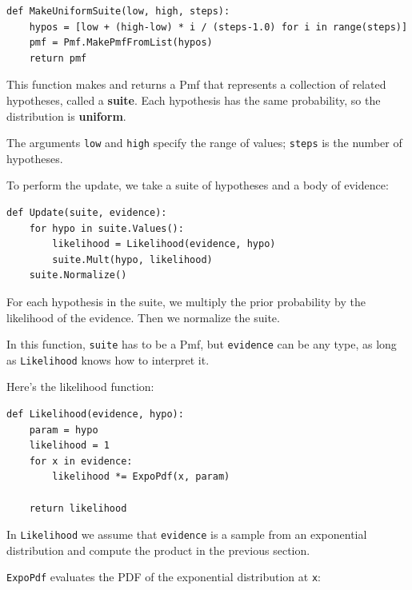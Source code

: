 \documentclass[12pt]{book}
\begin{document}
\begin{verbatim}
def MakeUniformSuite(low, high, steps):
    hypos = [low + (high-low) * i / (steps-1.0) for i in range(steps)]
    pmf = Pmf.MakePmfFromList(hypos)
    return pmf
\end{verbatim}

This function makes and returns a Pmf that represents a 
collection of related hypotheses, called a {\bf suite}.  Each hypothesis
has the same probability, so the distribution is {\bf uniform}.



The arguments {\tt low} and {\tt high} specify the range of values;
{\tt steps} is the number of hypotheses.


To perform the update, we take a suite of hypotheses and a body of
evidence:

\begin{verbatim}
def Update(suite, evidence):
    for hypo in suite.Values():
        likelihood = Likelihood(evidence, hypo)
        suite.Mult(hypo, likelihood)
    suite.Normalize()
\end{verbatim}

For each hypothesis in the suite, we multiply the prior probability
by the likelihood of the evidence.  Then we normalize the suite.

In this function, {\tt suite} has to be a Pmf, but {\tt evidence}
can be any type, as long as {\tt Likelihood} knows how to interpret it.


Here's the likelihood function:

\begin{verbatim}
def Likelihood(evidence, hypo):
    param = hypo
    likelihood = 1
    for x in evidence:
        likelihood *= ExpoPdf(x, param)

    return likelihood
\end{verbatim}

In {\tt Likelihood} we assume that {\tt evidence} is a sample
from an exponential distribution and compute the product in the
previous section.


{\tt ExpoPdf} evaluates the PDF of the exponential distribution
at {\tt x}:
\end{document}
